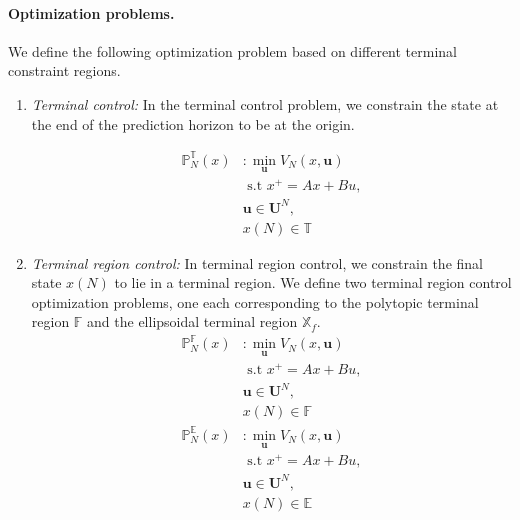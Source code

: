 \documentclass[10pt, twocolumn]{article}
\newcommand{\bu}{\mathbf{u}}
\newcommand{\set}[1]{\left\lbrace #1 \right\rbrace}
\theoremstyle{definition}
\begin{document}
\paragraph{\textbf{Optimization problems.}} We define the following
optimization problem based on different terminal constraint regions.
\begin{enumerate}
\item {\em{Terminal control:}} In the terminal control problem, we
  constrain the state at the end of the prediction horizon to be at
  the origin. 

\begin{align*} \mathbb{P}_N^{\mathbb{T}}(x) &: \min_{\bu}{V_N(x,\bu)}\\ &
  \text{~s.t~} x^+ = Ax+Bu,\\& \bu \in \mathbf{U}^N,\\& x(N) \in
  \mathbb{T} \end{align*}

\item {\em{ Terminal region control:}} In terminal region control, we constrain the final state $x(N)$ to lie in a terminal region. We define two terminal region control optimization problems, one each corresponding to the polytopic terminal region $\mathbb{F}$ and the ellipsoidal terminal region $\mathbb{X}_f$.
\begin{align*}\mathbb{P}_N^{\mathbb{F}}(x) &: \min_{\bu}{V_N(x,\bu)} \\& \text{~s.t~} x^+ = Ax+Bu,\\& \bu \in \mathbf{U}^N,\\& x(N) \in \mathbb{F} \end{align*}
\begin{align*} \mathbb{P}_N^{\mathbb{E}}(x) &: \min_{\bu}{V_N(x,\bu)}\\& \text{~s.t~} x^+ = Ax+Bu,\\& \bu \in \mathbf{U}^N,\\& x(N) \in \mathbb{E} \end{align*}

\end{enumerate}
\end{document}
